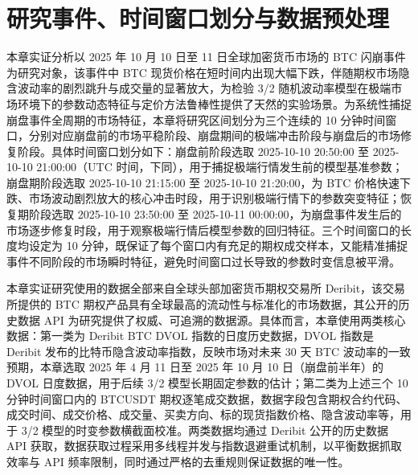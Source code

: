 \section{ 研究事件、时间窗口划分与数据预处理}

本章实证分析以 2025 年 10 月 10 日至 11 日全球加密货币市场的 BTC 闪崩事件为研究对象，该事件中 BTC 现货价格在短时间内出现大幅下跌，伴随期权市场隐含波动率的剧烈跳升与成交量的显著放大，为检验 3/2 随机波动率模型在极端市场环境下的参数动态特征与定价方法鲁棒性提供了天然的实验场景。为系统性捕捉崩盘事件全周期的市场特征，本章将研究区间划分为三个连续的 10 分钟时间窗口，分别对应崩盘前的市场平稳阶段、崩盘期间的极端冲击阶段与崩盘后的市场修复阶段。具体时间窗口划分如下：崩盘前阶段选取 2025-10-10 20:50:00 至 2025-10-10 21:00:00（UTC 时间，下同），用于捕捉极端行情发生前的模型基准参数；崩盘期阶段选取 2025-10-10 21:15:00 至 2025-10-10 21:20:00，为 BTC 价格快速下跌、市场波动剧烈放大的核心冲击时段，用于识别极端行情下的参数突变特征；恢复期阶段选取 2025-10-10 23:50:00 至 2025-10-11 00:00:00，为崩盘事件发生后的市场逐步修复时段，用于观察极端行情后模型参数的回归特征。三个时间窗口的长度均设定为 10 分钟，既保证了每个窗口内有充足的期权成交样本，又能精准捕捉事件不同阶段的市场瞬时特征，避免时间窗口过长导致的参数时变信息被平滑。

本章实证研究使用的数据全部来自全球头部加密货币期权交易所 Deribit，该交易所提供的 BTC 期权产品具有全球最高的流动性与标准化的市场数据，其公开的历史数据 API 为研究提供了权威、可追溯的数据源。具体而言，本章使用两类核心数据：第一类为 Deribit BTC DVOL 指数的日度历史数据，DVOL 指数是 Deribit 发布的比特币隐含波动率指数，反映市场对未来 30 天 BTC 波动率的一致预期，本章选取 2025 年 4 月 11 日至 2025 年 10 月 10 日（崩盘前半年）的 DVOL 日度数据，用于后续 3/2 模型长期固定参数的估计；第二类为上述三个 10 分钟时间窗口内的 BTCUSDT 期权逐笔成交数据，数据字段包含期权合约代码、成交时间、成交价格、成交量、买卖方向、标的现货指数价格、隐含波动率等，用于 3/2 模型的时变参数横截面校准。两类数据均通过 Deribit 公开的历史数据 API 获取，数据获取过程采用多线程并发与指数退避重试机制，以平衡数据抓取效率与 API 频率限制，同时通过严格的去重规则保证数据的唯一性。

